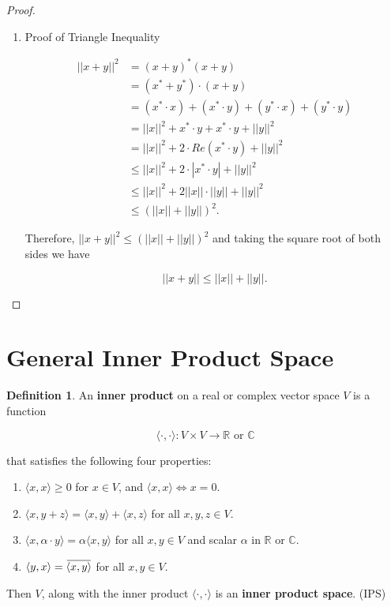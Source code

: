 \documentclass[12pt]{article}
\newcommand{\overbar}[1]{\mkern 1.5mu\overline{\mkern-1.5mu#1\mkern-1.5mu}\mkern 1.5mu}
\theoremstyle{definition}
\newtheorem*{definition}{Definition}
\begin{document}
\begin{proof}
\begin{enumerate}[label = (\arabic*)]
\item Proof of Triangle Inequality

\begin{align*}
||x + y||^2 &= (x + y)^* (x + y) \\
&= (x^* + y^*) \cdot (x + y) \\
&= (x^* \cdot x) + (x^* \cdot y) + (y^* \cdot x) + (y^* \cdot y) \\
&= ||x||^2 + x^* \cdot y + x^* \cdot y + ||y||^2 \\
&= ||x||^2 + 2 \cdot Re(x^* \cdot y) + ||y||^2 \\
&\leq ||x||^2 + 2 \cdot |x^* \cdot y| + ||y||^2 \\
&\leq ||x||^2 + 2||x|| \cdot ||y|| + ||y||^2 \\
&\leq (||x|| + ||y||)^2.
\end{align*}

Therefore, $||x + y||^2 \leq (||x|| + ||y||)^2$ and taking the square root of both sides
we have

\[||x+y|| \leq ||x|| + ||y||.\]

\end{enumerate}

\end{proof}


\section{General Inner Product Space}

\begin{definition}
An \textbf{inner product} on a real or complex vector space $V$ is a function

\[\langle \cdot, \cdot \rangle : V \times V \rightarrow \mathbb{R} \text{ or } \mathbb{C} \]

that satisfies the following four properties:

\begin{enumerate}[label = (\arabic*)]

\item $\langle x, x \rangle \geq 0$ for $x \in V$, and $\langle x, x \rangle \iff x = 0$.
\item $\langle x, y+z \rangle = \langle x,y \rangle + \langle x,z \rangle$ for all $x, y, z \in V$.
\item $\langle x, \alpha \cdot y \rangle = \alpha \langle x, y \rangle$ for all $x,y \in V$ and scalar $\alpha$ in
$\mathbb{R}$ or $\mathbb{C}$.
\item $\langle y,x \rangle = \overbar{\langle x, y \rangle}$ for all $x, y \in V$.

\end{enumerate}

Then $V$, along with the inner product $\langle \cdot, \cdot \rangle$ is an \textbf{inner product space}. (IPS)
\end{definition}
\end{document}

